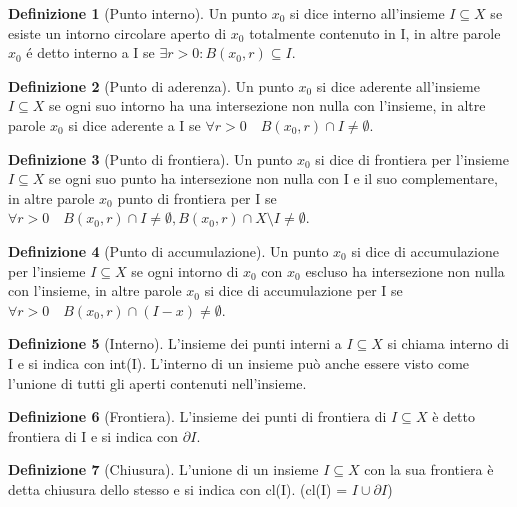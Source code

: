 \documentclass[leqno]{article}
\theoremstyle{definition}
\newtheorem{definition}{Definizione}[section]
\numberwithin{equation}{section}
\theoremstyle{remark}
\begin{document}
	\begin{definition}[Punto interno]
		Un punto $x_0$ si dice interno all'insieme $I\subseteq X$ se esiste un intorno circolare aperto di $x_0$ totalmente contenuto in I, in altre parole $x_0$ é detto interno a I se  $ \exists r>0 : B(x_0,r)\subseteq I$. 
	\end{definition}
	\begin{definition}[Punto di aderenza]
		Un punto $x_0$ si dice aderente all'insieme $I\subseteq X$ se ogni suo intorno ha una intersezione non nulla con l'insieme, in altre parole $x_0$ si dice aderente a I se $\forall r > 0 \quad B(x_0,r)\cap I \neq \emptyset $.
	\end{definition}
	\begin{definition}[Punto di frontiera]
		Un punto $x_0$ si dice di frontiera per l'insieme $I\subseteq X$ se ogni suo punto ha intersezione non nulla con I e il suo complementare, in altre parole $x_0$ punto di frontiera per I se $\forall r>0 \quad B(x_0,r)\cap I \neq \emptyset, B(x_0,r)\cap X\setminus I \neq \emptyset $.
	\end{definition}
	\begin{definition}[Punto di accumulazione]
		Un punto $x_0$ si dice di accumulazione per l'insieme $I\subseteq X$ se ogni intorno di $x_0$ con $x_0$ escluso ha intersezione non  nulla con l'insieme, in altre parole $x_0$ si dice di accumulazione per I se $\forall r > 0 \quad B(x_0,r)\cap (I-x)\neq \emptyset$.
	\end{definition}
	\begin{definition}[Interno]
		L'insieme dei punti interni a $I\subseteq X$ si chiama interno di I e si indica con int(I). L'interno di un insieme può anche essere visto come l'unione di tutti gli aperti contenuti nell'insieme.
	\end{definition}
	\begin{definition}[Frontiera]
		L'insieme dei punti di frontiera di $I\subseteq X$ è detto frontiera di I e si indica con $\partial I$.
	\end{definition}
	\begin{definition}[Chiusura]
		L'unione di un insieme $I\subseteq X$ con la sua frontiera è detta chiusura dello stesso e si indica con cl(I). (cl(I) = $I \cup \partial I$) 
	\end{definition}
\end{document}
